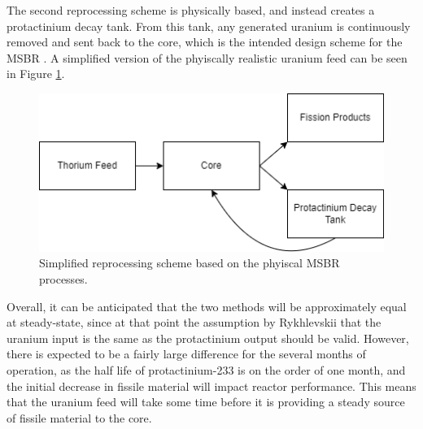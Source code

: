 The second reprocessing scheme is physically based, and instead creates a protactinium decay tank. From this tank, any generated uranium is continuously removed and sent back to the core, which is the intended design scheme for the MSBR \cite{robertson_conceptual_1971}. A simplified version of the phyiscally realistic uranium feed can be seen in Figure \ref{fig:nonspmatchrepr}.

\begin{figure}[H]
  \centering
  \includegraphics[scale=0.45]{images/phys-repr-scheme.png}
  \caption{Simplified reprocessing scheme based on the phyiscal MSBR processes.}
   \label{fig:nonspmatchrepr}
\end{figure}

Overall, it can be anticipated that the two methods will be approximately equal at steady-state, since at that point the assumption by Rykhlevskii that the uranium input is the same as the protactinium output should be valid. However, there is expected to be a fairly large difference for the several months of operation, as the half life of protactinium-233 is on the order of one month, and the initial decrease in fissile material will impact reactor performance. This means that the uranium feed will take some time before it is providing a steady source of fissile material to the core.


